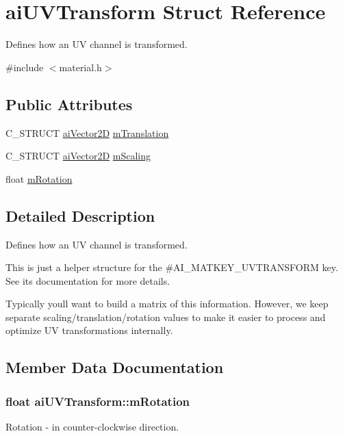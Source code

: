 \hypertarget{structai_u_v_transform}{}\section{ai\+U\+V\+Transform Struct Reference}
\label{structai_u_v_transform}


Defines how an UV channel is transformed.  




{\ttfamily \#include $<$material.\+h$>$}

\subsection*{Public Attributes}
\begin{DoxyCompactItemize}
\item 
C\+\_\+\+S\+T\+R\+U\+CT \hyperlink{structai_vector2_d}{ai\+Vector2D} \hyperlink{structai_u_v_transform_a8c7f35959aa342bf0cef670246fbb813}{m\+Translation}
\item 
C\+\_\+\+S\+T\+R\+U\+CT \hyperlink{structai_vector2_d}{ai\+Vector2D} \hyperlink{structai_u_v_transform_a89429a027cbf914e7212e48149a957c8}{m\+Scaling}
\item 
float \hyperlink{structai_u_v_transform_aa8dcf39ccd39f786b3f5f163bd663792}{m\+Rotation}
\end{DoxyCompactItemize}


\subsection{Detailed Description}
Defines how an UV channel is transformed. 

This is just a helper structure for the \#\+A\+I\+\_\+\+M\+A\+T\+K\+E\+Y\+\_\+\+U\+V\+T\+R\+A\+N\+S\+F\+O\+RM key. See its documentation for more details.

Typically you\textquotesingle{}ll want to build a matrix of this information. However, we keep separate scaling/translation/rotation values to make it easier to process and optimize UV transformations internally. 

\subsection{Member Data Documentation}
\subsubsection[{\texorpdfstring{m\+Rotation}{mRotation}}]{\setlength{\rightskip}{0pt plus 5cm}float ai\+U\+V\+Transform\+::m\+Rotation}\hypertarget{structai_u_v_transform_aa8dcf39ccd39f786b3f5f163bd663792}{}\label{structai_u_v_transform_aa8dcf39ccd39f786b3f5f163bd663792}
Rotation -\/ in counter-\/clockwise direction.

